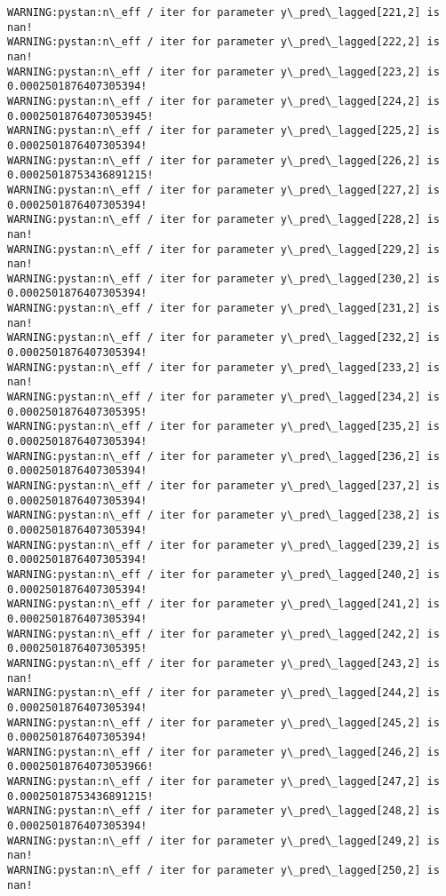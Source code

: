 \documentclass[11pt]{article}
\begin{document}
\begin{Verbatim}[commandchars=\\\{\}]
WARNING:pystan:n\_eff / iter for parameter y\_pred\_lagged[221,2] is nan!
WARNING:pystan:n\_eff / iter for parameter y\_pred\_lagged[222,2] is nan!
WARNING:pystan:n\_eff / iter for parameter y\_pred\_lagged[223,2] is 0.0002501876407305394!
WARNING:pystan:n\_eff / iter for parameter y\_pred\_lagged[224,2] is 0.00025018764073053945!
WARNING:pystan:n\_eff / iter for parameter y\_pred\_lagged[225,2] is 0.0002501876407305394!
WARNING:pystan:n\_eff / iter for parameter y\_pred\_lagged[226,2] is 0.00025018753436891215!
WARNING:pystan:n\_eff / iter for parameter y\_pred\_lagged[227,2] is 0.0002501876407305394!
WARNING:pystan:n\_eff / iter for parameter y\_pred\_lagged[228,2] is nan!
WARNING:pystan:n\_eff / iter for parameter y\_pred\_lagged[229,2] is nan!
WARNING:pystan:n\_eff / iter for parameter y\_pred\_lagged[230,2] is 0.0002501876407305394!
WARNING:pystan:n\_eff / iter for parameter y\_pred\_lagged[231,2] is nan!
WARNING:pystan:n\_eff / iter for parameter y\_pred\_lagged[232,2] is 0.0002501876407305394!
WARNING:pystan:n\_eff / iter for parameter y\_pred\_lagged[233,2] is nan!
WARNING:pystan:n\_eff / iter for parameter y\_pred\_lagged[234,2] is 0.0002501876407305395!
WARNING:pystan:n\_eff / iter for parameter y\_pred\_lagged[235,2] is 0.0002501876407305394!
WARNING:pystan:n\_eff / iter for parameter y\_pred\_lagged[236,2] is 0.0002501876407305394!
WARNING:pystan:n\_eff / iter for parameter y\_pred\_lagged[237,2] is 0.0002501876407305394!
WARNING:pystan:n\_eff / iter for parameter y\_pred\_lagged[238,2] is 0.0002501876407305394!
WARNING:pystan:n\_eff / iter for parameter y\_pred\_lagged[239,2] is 0.0002501876407305394!
WARNING:pystan:n\_eff / iter for parameter y\_pred\_lagged[240,2] is 0.0002501876407305394!
WARNING:pystan:n\_eff / iter for parameter y\_pred\_lagged[241,2] is 0.0002501876407305394!
WARNING:pystan:n\_eff / iter for parameter y\_pred\_lagged[242,2] is 0.0002501876407305395!
WARNING:pystan:n\_eff / iter for parameter y\_pred\_lagged[243,2] is nan!
WARNING:pystan:n\_eff / iter for parameter y\_pred\_lagged[244,2] is 0.0002501876407305394!
WARNING:pystan:n\_eff / iter for parameter y\_pred\_lagged[245,2] is 0.0002501876407305394!
WARNING:pystan:n\_eff / iter for parameter y\_pred\_lagged[246,2] is 0.00025018764073053966!
WARNING:pystan:n\_eff / iter for parameter y\_pred\_lagged[247,2] is 0.00025018753436891215!
WARNING:pystan:n\_eff / iter for parameter y\_pred\_lagged[248,2] is 0.0002501876407305394!
WARNING:pystan:n\_eff / iter for parameter y\_pred\_lagged[249,2] is nan!
WARNING:pystan:n\_eff / iter for parameter y\_pred\_lagged[250,2] is nan!

\end{Verbatim}
\end{document}
